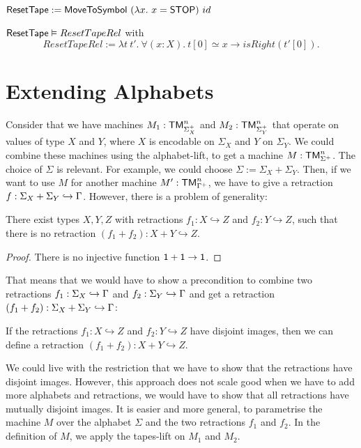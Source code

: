 \begin{definition}[$\MS{ResetTape}$][Reset]
  \label{def:Reset}
  $\mathsf{ResetTape} := \mathsf{MoveToSymbol}~(\lambda x.~x=\mathsf{STOP})~id$
\end{definition}

\begin{lemma}
  \label{lem:Reset_Realise}
  $\mathsf{ResetTape} \mathrel{\vDash} ResetTapeRel$ with
  \[
    ResetTapeRel := \lambda t~t'.~\forall(x:X).~t[0] \simeq x \rightarrow isRight(t'[0]).
  \]
\end{lemma}


\section{Extending Alphabets}
\label{sec:extend-alphabet}

Consider that we have machines $M_1 : \mathsf{TM}_{\Sigma_X^+}^n$ and $M_2 : \mathsf{TM}_{\Sigma_Y^+}^n$ that operate on values of type $X$ and $Y$, where $X$ is
encodable on $\Sigma_X$ and $Y$ on $\Sigma_Y$.  We could combine these machines using the alphabet-lift, to get a machine $M : \mathsf{TM}_{\Sigma^+}^n$.  The
choice of $\Sigma$ is relevant.  For example, we could choose $\Sigma := \Sigma_X + \Sigma_Y$.  Then, if we want to use $M$ for another machine
$M' : \mathsf{TM}_{\Gamma^+}^n$, we have to give a retraction $f : \Sigma_X+\Sigma_Y \hookrightarrow \Gamma$.  However, there is a problem of generality:
\begin{fact}
  There exist types $X,Y,Z$ with retractions $f_1 : X \hookrightarrow Z$ and $f_2 : Y \hookrightarrow Z$, such that there is no retraction
  $(f_1+f_2) : X+Y \hookrightarrow Z$.
\end{fact}
\begin{proof}
  There is no injective function $\mathsf{1}+\mathsf{1}\rightarrow\mathsf{1}$.
\end{proof}

That means that we would have to show a precondition to combine two retractions $f_1 : \Sigma_X \hookrightarrow \Gamma$ and
$f_2 : \Sigma_Y \hookrightarrow \Gamma$ and get a retraction $(f_1+f_2) : \Sigma_X + \Sigma_Y \hookrightarrow \Gamma$:
\begin{fact}
  If the retractions $f_1 : X \hookrightarrow Z$ and $f_2 : Y \hookrightarrow Z$ have disjoint images, then we can define a retraction
  $(f_1+f_2) : X+Y \hookrightarrow Z$.
\end{fact}

We could live with the restriction that we have to show that the retractions have disjoint images.  However, this approach does not scale good when we
have to add more alphabets and retractions, we would have to show that all retractions have mutually disjoint images.  It is easier and more general,
to parametrise the machine $M$ over the alphabet $\Sigma$ and the two retractions $f_1$ and $f_2$.  In the definition of $M$, we apply the tapes-lift
on $M_1$ and $M_2$.



